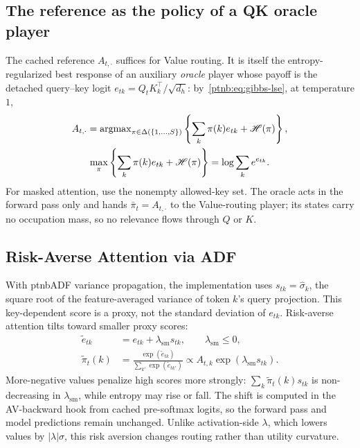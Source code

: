 \subsection{The reference as the policy of a QK oracle player}\label{ptnb:app:attention-oracle}

The cached reference $A_{t,\cdot}$ suffices for Value routing. It is itself the entropy-regularized best response of an auxiliary \emph{oracle} player whose payoff is the detached query--key logit $e_{tk}=Q_tK_k^\top/\sqrt{d_h}$: by~\eqref{ptnb:eq:gibbs-lse}, at temperature $1$,
\begin{equation}\label{ptnb:eq:attn-qk-oracle}
\begin{gathered}
    A_{t,\cdot}=\operatorname{argmax}_{\pi\in\Delta(\{1,\dots,S\})}
      \left\{\sum_k\pi(k)e_{tk}+\mathscr{H}(\pi)\right\},\\
    \max_{\pi}\left\{\sum_k\pi(k)e_{tk}+\mathscr{H}(\pi)\right\}
      =\log\sum_k e^{e_{tk}}.
\end{gathered}
\end{equation}
For masked attention, use the nonempty allowed-key set. The oracle acts in the forward pass only and hands $\bar\pi_t=A_{t,\cdot}$ to the Value-routing player; its states carry no occupation mass, so no relevance flows through $Q$ or $K$.

\subsection{Risk-Averse Attention via ADF}\label{ptnb:app:risk-attn}

With \ac{ptnbADF} variance propagation, the implementation uses $s_{tk}=\hat\sigma_k$, the square root of the feature-averaged variance of token $k$'s query projection. This key-dependent score is a proxy, not the standard deviation of $e_{tk}$. Risk-averse attention tilts toward smaller proxy scores:
\begin{align}
    \tilde e_{tk}&=e_{tk}+\lambda_{\mathrm{sm}}s_{tk},
       \qquad\lambda_{\mathrm{sm}}\le0,\label{ptnb:eq:risk-attn-policy}\\
    \tilde\pi_t(k)&=\frac{\exp(\tilde e_{tk})}{\sum_{k'}\exp(\tilde e_{tk'})}
       \propto A_{t,k}\exp(\lambda_{\mathrm{sm}}s_{tk}).\label{ptnb:eq:risk-attn-policy-softmax}
\end{align}
More-negative values penalize high scores more strongly: $\sum_k\tilde\pi_t(k)s_{tk}$ is non-decreasing in $\lambda_{\mathrm{sm}}$, while entropy may rise or fall. The shift is computed in the AV-backward hook from cached pre-softmax logits, so the forward pass and model predictions remain unchanged. Unlike activation-side $\lambda$, which lowers values by $|\lambda|\sigma$, this risk aversion changes routing rather than utility curvature.

